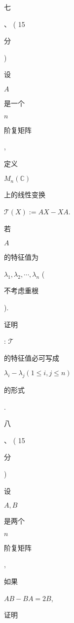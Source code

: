 \documentclass[10pt]{article}
\begin{document}
\begin{CJK}{UTF8}{mj}七\end{CJK}、 ( 15 \begin{CJK}{UTF8}{mj}分\end{CJK}) \begin{CJK}{UTF8}{mj}设\end{CJK} $A$ \begin{CJK}{UTF8}{mj}是一个\end{CJK} $n$ \begin{CJK}{UTF8}{mj}阶复矩阵\end{CJK}, \begin{CJK}{UTF8}{mj}定义\end{CJK} $M_{n}(\mathbb{C})$ \begin{CJK}{UTF8}{mj}上的线性变换\end{CJK} $\mathcal{T}(X):=A X-X A$. \begin{CJK}{UTF8}{mj}若\end{CJK} $A$ \begin{CJK}{UTF8}{mj}的特征值为\end{CJK} $\lambda_{1}, \lambda_{2}, \cdots, \lambda_{n}$ (\begin{CJK}{UTF8}{mj}不考虑重根\end{CJK}). \begin{CJK}{UTF8}{mj}证明\end{CJK}: $\mathcal{T}$ \begin{CJK}{UTF8}{mj}的特征值必可写成\end{CJK} $\lambda_{i}-\lambda_{j}(1 \leq i, j \leq n)$ \begin{CJK}{UTF8}{mj}的形式\end{CJK}.

\begin{CJK}{UTF8}{mj}八\end{CJK}、 ( 15 \begin{CJK}{UTF8}{mj}分\end{CJK}) \begin{CJK}{UTF8}{mj}设\end{CJK} $A, B$ \begin{CJK}{UTF8}{mj}是两个\end{CJK} $n$ \begin{CJK}{UTF8}{mj}阶复矩阵\end{CJK}, \begin{CJK}{UTF8}{mj}如果\end{CJK} $A B-B A=2 B$, \begin{CJK}{UTF8}{mj}证明\end{CJK}
\end{document}

